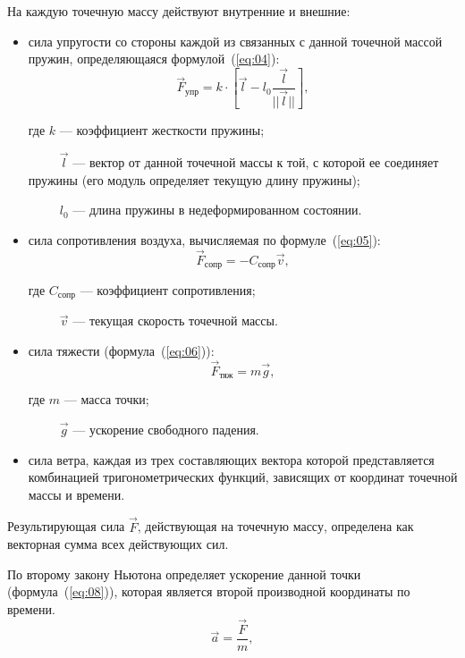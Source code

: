 На каждую точечную массу действуют внутренние и
внешние:
\begin{itemize}
    \item сила упругости со стороны каждой из связанных с данной точечной массой
        пружин, определяющаяся формулой~(\ref{eq:04}):
        \begin{equation}\label{eq:04}
            \vec{F}_{\text{упр}} = k \cdot [\vec{l} -
            l_0\frac{\vec{l}}{||\vec{l}||}],
        \end{equation}

        где $k$ --- коэффициент жесткости пружины;

        ~~~~~$\vec{l}$ --- вектор от данной точечной массы к той, с которой ее
        соединяет пружины (его модуль определяет текущую длину пружины);

        ~~~~~$l_0$ --- длина пружины в недеформированном состоянии.

    \item сила сопротивления воздуха, вычисляемая по формуле~(\ref{eq:05}):
        \begin{equation}\label{eq:05}
            \vec{F}_{\text{сопр}} = - C_{\text{сопр}}\vec{v},
        \end{equation}

        где $C_{\text{сопр}}$ --- коэффициент сопротивления;
        
        ~~~~~$\vec{v}$ --- текущая скорость точечной массы.

    \item сила тяжести (формула~(\ref{eq:06})):
        \begin{equation}\label{eq:06}
            \vec{F}_{\text{тяж}} = m\vec{g},
        \end{equation}

        где $m$ --- масса точки;

        ~~~~~$\vec{g}$ --- ускорение свободного падения.

    \item сила ветра, каждая из трех составляющих вектора которой
        представляется комбинацией тригонометрических функций,
        зависящих от координат точечной массы и времени.
\end{itemize}

Результирующая сила $\vec{F}$, действующая на точечную массу, определена как
векторная сумма всех действующих сил.

По второму закону Ньютона определяет ускорение данной точки
(формула~(\ref{eq:08})), которая является второй производной координаты по
времени. 
\begin{equation}\label{eq:08}
    \vec{a} = \frac{\vec{F}}{m},
\end{equation}

